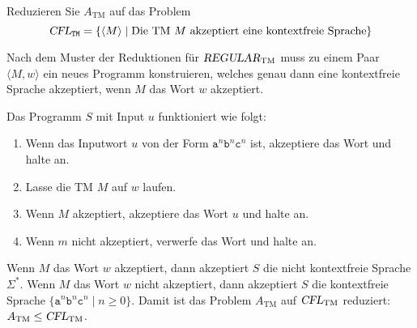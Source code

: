 Reduzieren Sie $A_{\text{TM}}$ auf das Problem
\[
\textsl{CFL}_{\texttt{TM}}
=
\{
\langle M\rangle
\mid
\text{Die TM $M$ akzeptiert eine kontextfreie Sprache}
\}
\]

\begin{loesung}
Nach dem Muster der Reduktionen für $\textsl{REGULAR}_{\text{TM}}$
muss zu einem Paar $\langle M,w\rangle$ ein neues Programm konstruieren,
welches genau dann eine kontextfreie Sprache akzeptiert, wenn 
$M$ das Wort $w$ akzeptiert.

Das Programm $S$ mit Input $u$ funktioniert wie folgt:
\begin{enumerate}
\item
Wenn das Inputwort $u$ von der Form
$\texttt{a}^n\texttt{b}^n\texttt{c}^n$
ist, akzeptiere das Wort und halte an.
\item 
Lasse die TM $M$ auf $w$ laufen.
\item
Wenn $M$ akzeptiert, akzeptiere das Wort $u$ und halte an.
\item
Wenn $m$ nicht akzeptiert, verwerfe das Wort und halte an.
\end{enumerate}
Wenn $M$ das Wort $w$ akzeptiert, dann akzeptiert $S$ die nicht
kontextfreie Sprache $\Sigma^*$.
Wenn $M$ das Wort $w$ nicht akzeptiert, dann akzeptiert $S$ die
kontextfreie Sprache $\{\texttt{a}^n\texttt{b}^n\texttt{c}^n \mid n\ge 0\}$.
Damit ist das Problem $A_{\text{TM}}$ auf $\textsl{CFL}_{\text{TM}}$
reduziert: $A_{\text{TM}}\le \textsl{CFL}_{\text{TM}}$.
\end{loesung}
